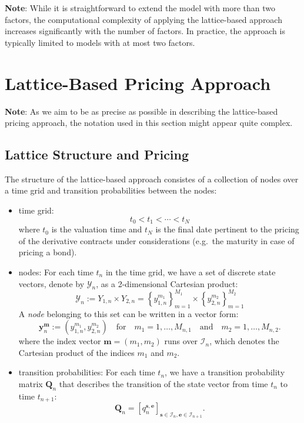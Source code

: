\documentclass{texyise}
\newcommand{\indexset}{\mathcal{I}}
\begin{document}
\textbf{Note}: While it is straightforward to extend the model with more than two factors, the computational complexity of applying the lattice-based approach increases significantly with the number of factors. In practice, the approach is typically limited to models with at most two factors.

\section{Lattice-Based Pricing Approach}
\label{S:lattice-based-pricing}

\textbf{Note}: As we aim to be as precise as possible in describing the lattice-based pricing approach, the notation used in this section might appear quite complex. 


\subsection{Lattice Structure and Pricing}
\label{S:lattice-structure}

The structure of the lattice-based approach consistes of a collection of nodes over a time grid and transition probabilities between the nodes:
\begin{itemize}
    \item time grid:
    \begin{equation}
        t_0 < t_1 < \cdots < t_N \label{E:time-grid}
    \end{equation}
    where $t_0$ is the valuation time and $t_N$ is the final date pertinent to the pricing of the derivative contracts under considerations (e.g.\ the maturity in case of pricing a bond). 
    \item nodes: For each time $t_n$ in the time grid, we have a set of discrete state vectors, denote by $\mathcal{Y}_n$, as a 2-dimensional Cartesian product:
    \begin{equation}
        \mathcal{Y}_n := Y_{1,n} \times Y_{2,n} = \left\{ y_{1,n}^{m_1} \right\}_{m=1}^{M_1} \times \left\{ y_{2,n}^{m_2} \right\}_{m=1}^{M_2}
        \label{E:node-set}
    \end{equation}
    A {\em node} belonging to this set can be written in a vector form:
    \begin{equation}
        \bm{y}_{n}^{\bm{m}} := (y_{1,n}^{m_1}, y_{2,n}^{m_2}) \quad\text{for}\quad m_1 = 1, \ldots, M_{n,1} \quad\text{and}\quad m_2 = 1, \ldots, M_{n,2}.
    \end{equation}
    where the index vector $\bm{m} = (m_1, m_2)$ runs over $\indexset_n$, which denotes the Cartesian product of the indices $m_1$ and $m_2$.

    \item transition probabilities: For each time $t_n$, we have a transition probability matrix $\bm{Q}_n$ that describes the transition of the state vector from time $t_n$ to time $t_{n+1}$:
    \begin{equation}
        \bm{Q}_n = \left[ q_{n}^{\bm{s},\bm{e}} \right]_{\bm{s} \in \indexset_n, \bm{e} \in \indexset_{n+1}}.
    \end{equation} 

\end{itemize}
\end{document}
